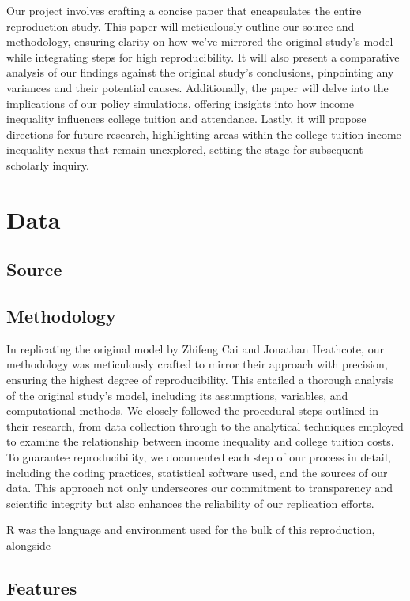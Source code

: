 \documentclass[
  letterpaper,
  DIV=11,
  numbers=noendperiod]{scrartcl}
\begin{document}
Our project involves crafting a concise paper that encapsulates the
entire reproduction study. This paper will meticulously outline our
source and methodology, ensuring clarity on how we've mirrored the
original study's model while integrating steps for high reproducibility.
It will also present a comparative analysis of our findings against the
original study's conclusions, pinpointing any variances and their
potential causes. Additionally, the paper will delve into the
implications of our policy simulations, offering insights into how
income inequality influences college tuition and attendance. Lastly, it
will propose directions for future research, highlighting areas within
the college tuition-income inequality nexus that remain unexplored,
setting the stage for subsequent scholarly inquiry.

\section{Data}\label{sec-data}

\subsection{Source}\label{source}

\subsection{Methodology}\label{methodology}

In replicating the original model by Zhifeng Cai and Jonathan Heathcote,
our methodology was meticulously crafted to mirror their approach with
precision, ensuring the highest degree of reproducibility. This entailed
a thorough analysis of the original study's model, including its
assumptions, variables, and computational methods. We closely followed
the procedural steps outlined in their research, from data collection
through to the analytical techniques employed to examine the
relationship between income inequality and college tuition costs. To
guarantee reproducibility, we documented each step of our process in
detail, including the coding practices, statistical software used, and
the sources of our data. This approach not only underscores our
commitment to transparency and scientific integrity but also enhances
the reliability of our replication efforts.

R was the language and environment used for the bulk of this
reproduction, alongside

\subsection{Features}\label{features}
\end{document}
